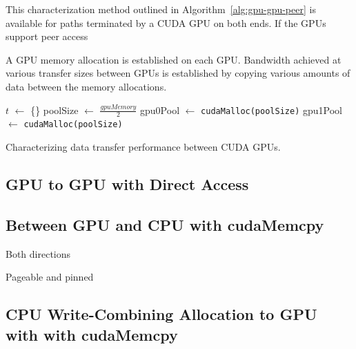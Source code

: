 This characterization method outlined in Algorithm~\ref{alg:gpu-gpu-peer} is available for paths terminated by a CUDA GPU on both ends.
If the GPUs support peer access

A GPU memory allocation is established on each GPU.
Bandwidth achieved at various transfer sizes between GPUs is established by copying various amounts of data between the memory allocations.


\begin{algorithm}[ht]
    \SetAlgoLined
    $t$ $\gets$ \{\}\;
    poolSize $\gets$ $\frac{gpuMemory}{2}$\;
    gpu0Pool $\gets$ \texttt{cudaMalloc(poolSize)}\;
    gpu1Pool $\gets$ \texttt{cudaMalloc(poolSize)}\;
    \caption{Characterizing data transfer performance between CUDA GPUs.}
    \label{alg:gpu-gpu-peer}
\end{algorithm}

\subsection{GPU to GPU with Direct Access}
\label{sec:gpu-gpu-direct}

\subsection{Between GPU and CPU with cudaMemcpy}
\label{sec:gpu-cpu}

Both directions

Pageable and pinned

\subsection{CPU Write-Combining Allocation to GPU with with cudaMemcpy}
\label{sec:wc-gpu}

